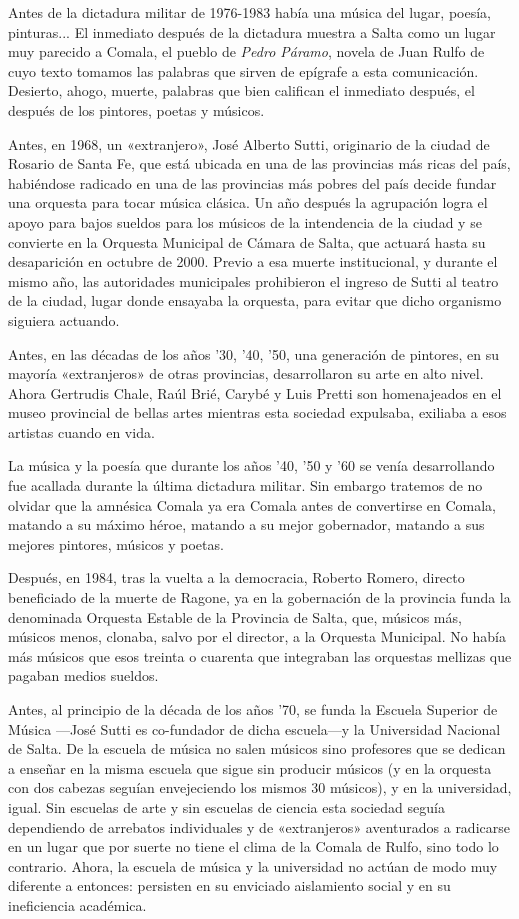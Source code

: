 Antes de la dictadura militar de 1976-1983 había una música del lugar, poesía, pinturas\@.\@.\@. El inmediato después de la dictadura muestra a Salta como un lugar muy parecido a Comala, el pueblo de \emph{Pedro Páramo}, novela de Juan Rulfo de cuyo texto tomamos las palabras que sirven de epígrafe a esta comunicación. Desierto, ahogo, muerte, palabras que bien califican el inmediato después, el después de los pintores, poetas y músicos.

Antes, en 1968, un «extranjero», José Alberto Sutti, originario de la ciudad de Rosario de Santa Fe, que está ubicada en una de las provincias más ricas del país, habiéndose radicado en una de las provincias más pobres del país decide fundar una orquesta para tocar música clásica. Un año después la agrupación logra el apoyo para bajos sueldos para los músicos de la intendencia de la ciudad y se convierte en la Orquesta Municipal de Cámara de Salta, que actuará hasta su desaparición en octubre de 2000. Previo a esa muerte institucional, y durante el mismo año, las autoridades municipales prohibieron el ingreso de Sutti al teatro de la ciudad, lugar donde ensayaba la orquesta, para evitar que dicho organismo siguiera actuando.

Antes, en las décadas de los años '30, '40, '50, una generación de pintores, en su mayoría «extranjeros» de otras provincias, desarrollaron su arte en alto nivel. Ahora Gertrudis Chale, Raúl Brié, Carybé y Luis Pretti son homenajeados en el museo provincial de bellas artes mientras esta sociedad expulsaba, exiliaba a esos artistas cuando en vida.

La música y la poesía que durante los años '40, '50 y '60 se venía desarrollando fue acallada durante la última dictadura militar. Sin embargo tratemos de no olvidar que la amnésica Comala ya era Comala antes de convertirse en Comala, matando a su máximo héroe, matando a su mejor gobernador, matando a sus mejores pintores, músicos y poetas.

Después, en 1984, tras la vuelta a la democracia, Roberto Romero, directo beneficiado de la muerte de Ragone, ya en la gobernación de la provincia funda la denominada Orquesta Estable de la Provincia de Salta, que, músicos más, músicos menos, clonaba, salvo por el director, a la Orquesta Municipal. No había más músicos que esos treinta o cuarenta que integraban las orquestas mellizas que pagaban medios sueldos.

Antes, al principio de la década de los años '70, se funda la Escuela Superior de Música ---José Sutti es co-fundador de dicha escuela---y la Universidad Nacional de Salta. De la escuela de música no salen músicos sino profesores que se dedican a enseñar en la misma escuela que sigue sin producir músicos (y en la orquesta con dos cabezas seguían envejeciendo los mismos 30 músicos), y en la universidad, igual. Sin escuelas de arte y sin escuelas de ciencia esta sociedad seguía dependiendo de arrebatos individuales y de «extranjeros» aventurados a radicarse en un lugar que por suerte no tiene el clima de la Comala de Rulfo, sino todo lo contrario. Ahora, la escuela de música y la universidad no actúan de modo muy diferente a entonces: persisten en su enviciado aislamiento social y en su ineficiencia académica.


